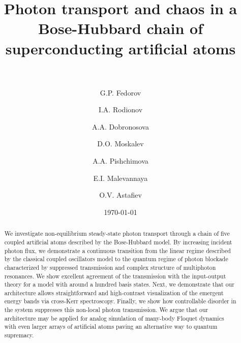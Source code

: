 \documentclass[%
 aps, prl,
 amsmath,amssymb,
 reprint,%
superscriptaddress
]{revtex4-2}
\newcommand{\mytitile}{Photon transport and chaos in a Bose-Hubbard chain of superconducting artificial atoms}
\begin{document}
	
	\title[\mytitile]{\mytitile\\~}
	\author{G.P. Fedorov}
	

	\author{I.A. Rodionov}
	
	
	\author{A.A. Dobronosova}
	
	
	\author{D.O. Moskalev}
	
	
	\author{A.A. Pishchimova}
	
	\author{E.I. Malevannaya}

	\author{O.V. Astafiev}
%
	
	
	\date{\today}%
	
	
	\begin{abstract}
We investigate non-equilibrium steady-state photon transport through a chain of five coupled artificial atoms described by the Bose-Hubbard model. By increasing incident photon flux, we demonstrate a continuous transition from the linear regime described by the classical coupled oscillators model to the quantum regime of photon blockade characterized by suppressed transmission and complex structure of multiphoton resonances. We show excellent agreement of the transmission with the input-output theory for a model with around a hundred basis states. Next, we demonstrate that our architecture allows straightforward and high-contrast visualization of the emergent energy bands via cross-Kerr spectroscopy. Finally, we show how controllable disorder in the system suppresses this non-local photon transmission. We argue that our architecture may be applied for analog simulation of many-body Floquet dynamics with even larger arrays of artificial atoms paving an alternative way to quantum supremacy.
	\end{abstract}
	
\end{document}
